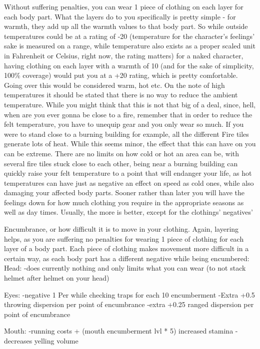 \documentclass[11pt]{report}
\begin{document}
Without suffering penalties, you can wear 1 piece of clothing on each layer for each body part. What the layers do to you specifically is pretty simple - for warmth, they add up all the warmth values to that body part. So while outside temperatures could be at a rating of -20 (temperature for the character's feelings' sake is measured on a range, while temperature also exists as a proper scaled unit in Fahrenheit or Celsius, right now, the rating matters) for a naked character, having clothing on each layer with a warmth of 10 (and for the sake of simplicity, 100\% coverage) would put you at a +20 rating, which is pretty comfortable. Going over this would be considered warm, hot etc.
On the note of high temperatures it should be stated that there is no way to reduce the ambient temperature. While you might think that this is not that big of a deal, since, hell, when are you ever gonna be close to a fire, remember that in order to reduce the felt temperature, you have to unequip gear and you only wear so much. If you were to stand close to a burning building for example, all the different Fire tiles generate lots of heat. While this seems minor, the effect that this can have on you can be extreme. There are no limits on how cold or hot an area can be, with several fire tiles stuck close to each other, being near a burning building can quickly raise your felt temperature to a point that will endanger your life, as hot temperatures can have just as negative an effect on speed as cold ones, while also damaging your affected body parts. Sooner rather than later you will have the feelings down for how much clothing you require in the appropriate seasons as well as day times. Usually, the more is better, except for the clothings' negatives'

Encumbrance, or how difficult it is to move in your clothing. Again, layering helps, as you are suffering no penalties for wearing 1 piece of clothing for each layer of a body part. Each piece of clothing makes movement more difficult in a certain way, as each body part has a different negative while being encumbered:
Head:
-does currently nothing and only limits what you can wear (to not stack helmet after helmet on your head)

Eyes:
-negative 1 Per while checking traps for each 10 encumberment
-Extra +0.5 throwing dispersion per point of encumbrance
-extra +0.25 ranged dispersion per point of encumbrance

Mouth:
-running costs + (mouth encumberment lvl * 5) increased stamina
-decreases yelling volume
\end{document}

